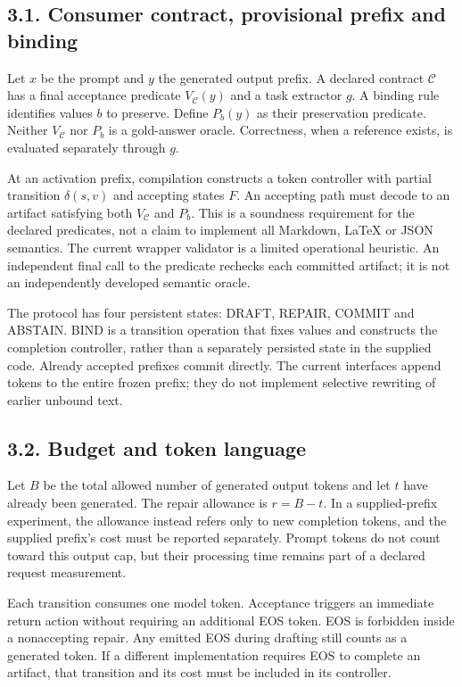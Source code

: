 \documentclass[
  12pt,
  a4paper,
]{article}
\begin{document}
\subsection{3.1. Consumer contract, provisional prefix and
binding}\label{consumer-contract-provisional-prefix-and-binding}

Let \(x\) be the prompt and \(y\) the generated output prefix. A
declared contract \(\mathcal C\) has a final acceptance predicate
\(V_{\mathcal C}(y)\) and a task extractor \(g\). A binding rule
identifies values \(b\) to preserve. Define \(P_b(y)\) as their
preservation predicate. Neither \(V_{\mathcal C}\) nor \(P_b\) is a
gold-answer oracle. Correctness, when a reference exists, is evaluated
separately through \(g\).

At an activation prefix, compilation constructs a token controller with
partial transition \(\delta(s,v)\) and accepting states \(F\). An
accepting path must decode to an artifact satisfying both
\(V_{\mathcal C}\) and \(P_b\). This is a soundness requirement for the
declared predicates, not a claim to implement all Markdown, LaTeX or
JSON semantics. The current wrapper validator is a limited operational
heuristic. An independent final call to the predicate rechecks each
committed artifact; it is not an independently developed semantic
oracle.

The protocol has four persistent states: DRAFT, REPAIR, COMMIT and
ABSTAIN. BIND is a transition operation that fixes values and constructs
the completion controller, rather than a separately persisted state in
the supplied code. Already accepted prefixes commit directly. The
current interfaces append tokens to the entire frozen prefix; they do
not implement selective rewriting of earlier unbound text.

\subsection{3.2. Budget and token
language}\label{budget-and-token-language}

Let \(B\) be the total allowed number of generated output tokens and let
\(t\) have already been generated. The repair allowance is \(r=B-t\). In
a supplied-prefix experiment, the allowance instead refers only to new
completion tokens, and the supplied prefix's cost must be reported
separately. Prompt tokens do not count toward this output cap, but their
processing time remains part of a declared request measurement.

Each transition consumes one model token. Acceptance triggers an
immediate return action without requiring an additional EOS token. EOS
is forbidden inside a nonaccepting repair. Any emitted EOS during
drafting still counts as a generated token. If a different
implementation requires EOS to complete an artifact, that transition and
its cost must be included in its controller.
\end{document}
